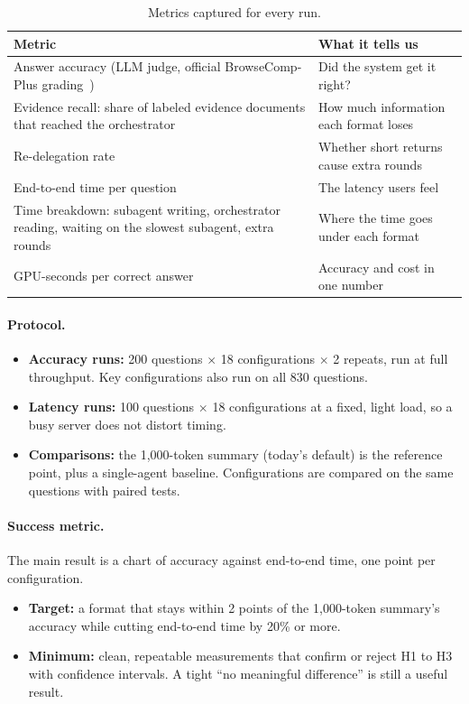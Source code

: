 \documentclass[11pt]{article}
\begin{document}
\begin{table}[!htbp]
  \centering\small
  \caption{Metrics captured for every run.}
  \label{tab:metrics}
  \begin{tabularx}{\linewidth}{@{}L P{5.6cm}@{}}
    \toprule
    \textbf{Metric} & \textbf{What it tells us} \\
    \midrule
    Answer accuracy (LLM judge, official BrowseComp-Plus grading~\citep{chen2025browsecompplus}) & Did the system get it right? \\
    Evidence recall: share of labeled evidence documents that reached the orchestrator & How much information each format loses \\
    Re-delegation rate & Whether short returns cause extra rounds \\
    End-to-end time per question & The latency users feel \\
    Time breakdown: subagent writing, orchestrator reading, waiting on the slowest subagent, extra rounds & Where the time goes under each format \\
    GPU-seconds per correct answer & Accuracy and cost in one number \\
    \bottomrule
  \end{tabularx}
\end{table}

\paragraph{Protocol.}
\begin{itemize}
  \item \textbf{Accuracy runs:} 200 questions $\times$ 18 configurations $\times$ 2 repeats, run at full throughput. Key configurations also run on all 830 questions.
  \item \textbf{Latency runs:} 100 questions $\times$ 18 configurations at a fixed, light load, so a busy server does not distort timing.
  \item \textbf{Comparisons:} the 1,000-token summary (today's default) is the reference point, plus a single-agent baseline. Configurations are compared on the same questions with paired tests.
\end{itemize}

\paragraph{Success metric.} The main result is a chart of accuracy against end-to-end time, one point per configuration.
\begin{itemize}
  \item \textbf{Target:} a format that stays within 2 points of the 1,000-token summary's accuracy while cutting end-to-end time by 20\% or more.
  \item \textbf{Minimum:} clean, repeatable measurements that confirm or reject H1 to H3 with confidence intervals. A tight ``no meaningful difference'' is still a useful result.
\end{itemize}
\end{document}
